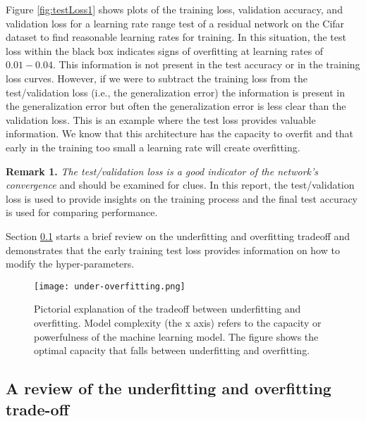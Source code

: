\documentclass{article} %
\begin{document}
Figure \ref{fig:testLoss1} shows plots of the training loss, validation accuracy, and validation loss for a learning rate range test of a residual network on the Cifar dataset to find reasonable learning rates for training.  In this situation, the test loss within the black box indicates signs of overfitting at learning rates of $0.01 - 0.04$.  This information is not present in the test accuracy or in the training loss curves.  However, if we were to subtract the training loss from the test/validation loss (i.e., the generalization error) the information is present in the generalization error but often the generalization error is less clear than the validation loss. This is an example where the test loss provides valuable information.  We know that this architecture has the capacity to overfit and that early in the training too small a learning rate will create  overfitting.  

\textbf{Remark 1.} \emph{The test/validation loss is a good indicator of the network's convergence} and should be examined for clues.
In this report, the test/validation loss is used to provide insights on the training process and the final test accuracy is used for comparing performance.

Section \ref{sec:fitting} starts a brief review on the underfitting and overfitting tradeoff and demonstrates that the early training test loss provides information on how to modify the hyper-parameters.

\begin{figure}[htb]
	\center
	\texttt{[image: under-overfitting.png]}
	\caption{Pictorial explanation of the tradeoff between underfitting and overfitting.  Model complexity (the x axis) refers to the capacity or powerfulness of the machine learning model.  The figure shows the optimal capacity that falls between underfitting and overfitting.}
	\label{fig:bias-variance}       %
\end{figure}


\subsection{A review of the underfitting and overfitting trade-off}
\label{sec:fitting}
\end{document}
